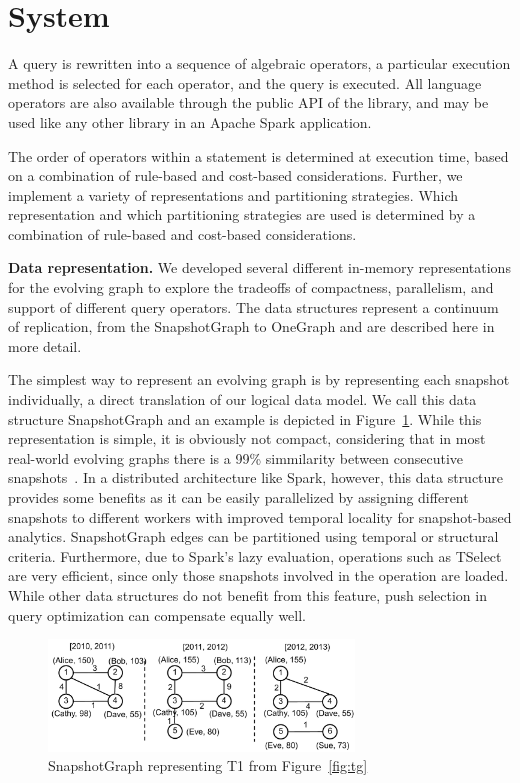 \section{System}
\label{sec:sys}

A \ql query is rewritten into a sequence of algebraic operators, a
particular execution method is selected for each operator, and the
query is executed.  All language operators are also available through
the public API of the \ql library, and may be used like any other
library in an Apache Spark application.

The order of operators within a \ql statement is determined at
execution time, based on a combination of rule-based and cost-based
considerations.  Further, we implement a variety of \tg
representations and partitioning strategies.  Which representation and
which partitioning strategies are used is determined by a combination
of rule-based and cost-based considerations.

{\bf Data representation.}  We developed several different in-memory
representations for the evolving graph to explore the tradeoffs of
compactness, parallelism, and support of different query operators.
The data structures represent a continuum of replication, from the
SnapshotGraph to OneGraph and are described here in more detail.

The simplest way to represent an evolving graph is by representing
each snapshot individually, a direct translation of our logical data
model.  We call this data structure SnapshotGraph and an example is
depicted in Figure~\ref{fig:sgp}.  While this representation is
simple, it is obviously not compact, considering that in most
real-world evolving graphs there is a 99\% simmilarity between
consecutive snapshots~\cite{?}.  In a distributed architecture like
Spark, however, this data structure provides some benefits as it can
be easily parallelized by assigning different snapshots to different
workers with improved temporal locality for snapshot-based analytics.
SnapshotGraph edges can be partitioned using temporal or structural
criteria.  Furthermore, due to Spark's lazy evaluation, operations
such as TSelect are very efficient, since only those snapshots
involved in the operation are loaded.  While other data structures do
not benefit from this feature, push selection in query optimization
can compensate equally well.

\begin{figure}[t!]
\includegraphics[width=3.2in]{figs/sgp.pdf}
\caption{SnapshotGraph representing T1 from Figure~\ref{fig:tg}}
\label{fig:sgp}
\end{figure}

